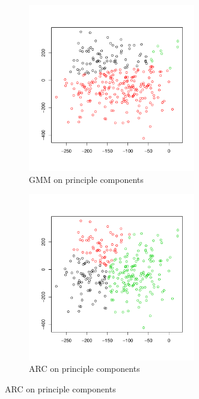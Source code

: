\documentclass[12pt]{article}
\begin{document}
\begin{figure}[H]
 \begin{subfigure}[b]{0.49\textwidth}
 \includegraphics[width=0.8\textwidth]{pics/pca_gmm.pdf}
  \caption{GMM on principle components}
\end{subfigure}
  \hfill
   \begin{subfigure}[b]{0.49\textwidth}
 \includegraphics[width=0.8\textwidth]{pics/pca_arc.pdf}
  \caption{ARC on principle components}
\end{subfigure}


\end{figure}
\end{document}
